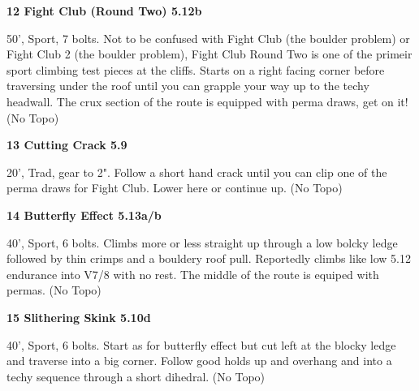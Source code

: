 \begin{multicols}{2}
\needspace{1.5cm}
\label{rt:Fight Club (Round Two)}
\colorbox{Goldenrod!50}{
\parbox{0.95\linewidth}{
\textbf{
12 Fight Club (Round Two) 5.12b  
}}}

\begin{adjustwidth}{0.5cm}{}			
50', Sport, 7 bolts. Not to be confused with Fight Club (the boulder problem) or Fight Club 2 (the boulder problem), Fight Club Round Two is one of the primeir sport climbing test pieces at the cliffs. Starts on a right facing corner before traversing under the roof until you can grapple your way up to the techy headwall. The crux section of the route is equipped with perma draws, get on it! (No Topo)
\end{adjustwidth}



\needspace{1.5cm}
\label{rt:Cutting Crack}
\colorbox{green!20}{
\parbox{0.95\linewidth}{
\textbf{
13 Cutting Crack 5.9  
}}}

\begin{adjustwidth}{0.5cm}{}			
20', Trad, gear to 2". Follow a short hand crack until you can clip one of the perma draws for Fight Club. Lower here or continue up. (No Topo)
\end{adjustwidth}



\needspace{1.5cm}
\label{rt:Butterfly Effect}
\colorbox{Goldenrod!50}{
\parbox{0.95\linewidth}{
\textbf{
14 Butterfly Effect 5.13a/b  
}}}

\begin{adjustwidth}{0.5cm}{}			
40', Sport, 6 bolts. Climbs more or less straight up through a low bolcky ledge followed by thin crimps and a bouldery roof pull. Reportedly climbs like low 5.12 endurance into V7/8 with no rest. The middle of the route is equiped with permas. (No Topo)
\end{adjustwidth}



\needspace{1.5cm}
\label{rt:Slithering Skink}
\colorbox{RoyalBlue!20}{
\parbox{0.95\linewidth}{
\textbf{
15 Slithering Skink 5.10d  
}}}

\begin{adjustwidth}{0.5cm}{}			
40', Sport, 6 bolts. Start as for butterfly effect but cut left at the blocky ledge and traverse into a big corner. Follow good holds up and overhang and into a techy sequence through a short dihedral. (No Topo)
\end{adjustwidth}




\end{multicols}
